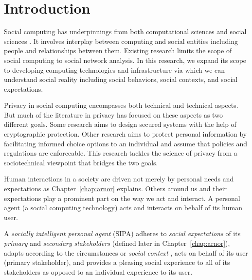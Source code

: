 \chapter{Introduction}
\label{chap:intro}

\begin{tcolorbox}[width=\columnwidth,
    tikznode boxed title,
    enhanced,
    interior style={white},
    boxsep=3pt,left=3pt,right=3pt,bottom=2pt,
    width=\columnwidth,
    boxrule=1pt,
    attach boxed title to top center= {yshift=-\tcboxedtitleheight/2},
    colbacktitle=white,coltitle=black,
    boxed title style={size=normal,colframe=white,boxrule=0pt},
    title={My Thesis},
    ]%
\end{tcolorbox}

Social computing has underpinnings from both computational sciences and social sciences \citep{wang2007social}. 
It involves interplay between computing and social entities including people and relationships between them. 
Existing research limits the scope of social computing to social network analysis. 
In this research, we expand its scope to developing computing technologies and infrastructure via which we can understand social reality including social behaviors, social contexts, and social expectations. 

Privacy in social computing encompasses both technical and technical aspects. But much of the
literature in privacy has focused on these aspects as two
different goals.  Some research aims to design secured systems with the help of
cryptographic protection. Other research aims to protect personal information
by facilitating informed choice options to an individual and assume that
policies and regulations are enforceable. This research tackles
the science of privacy from a sociotechnical viewpoint that bridges the 
two goals.

Human interactions in a society are driven not merely by personal needs
and expectations as Chapter~\ref{chap:arnor} explains. 
Others around us and their expectations play a
prominent part on the way we act and interact. A personal agent (a social computing technology) acts and
interacts on behalf of its human user. 

A \emph{socially intelligent personal agent} (SIPA) adheres to
\emph{social expectations} of its \emph{primary} and \emph{secondary} 
\emph{stakeholders} (defined later in
Chapter~\ref{chap:arnor}), adapts according to the circumstances or
\emph{social context} \citep{Dey-2001-Context}, acts on behalf of its
user (primary stakeholder), and provides a pleasing social
experience to all of its stakeholders as opposed to an individual
experience to its user.

